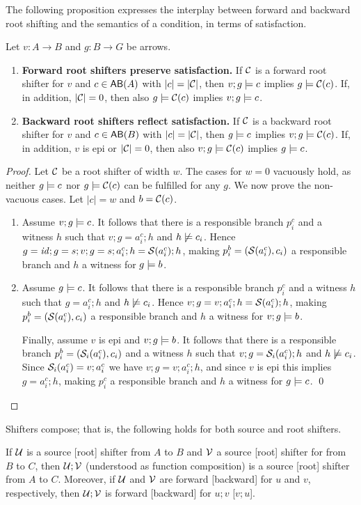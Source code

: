 The following proposition expresses the interplay between forward and backward root shifting and the semantics of a condition, in terms of satisfaction.
%
\begin{proposition}
Let $v:A\to B$ and $g:B\to G$ be arrows.
\begin{enumerate}
\item {\bfseries Forward root shifters preserve satisfaction.} If $\mathcal{C}$ is a forward root shifter for $v$ and $c\in\AB A$ with $|c|=|\mathcal{C}|$, then $v;g\models c$ implies $g\models \mathcal{C}(c)$. If, in addition, $|\mathcal{C}|=0$, then also $g\models \mathcal{C}(c)$ implies $v;g\models c$.
\item {\bfseries Backward root shifters reflect satisfaction.} If $\mathcal{C}$ is a backward root shifter for $v$ and $c\in\AB B$ with $|c|=|\mathcal{C}|$, then $g\models c$ implies $v;g\models \mathcal{C}(c)$. If, in addition, $v$ is epi or $|\mathcal{C}|=0$, then also $v;g\models \mathcal{C}(c)$ implies $g\models c$.
\end{enumerate}
\end{proposition}
%
\begin{proof}
Let $\mathcal{C}$ be a root shifter of width $w$. The cases for $w=0$ vacuously hold, as neither $g\models c$ nor $g\models \mathcal{C}(c)$ can be fulfilled for any $g$. We now prove the non-vacuous cases. Let $|c|=w$ and $b=\mathcal{C}(c)$.
\begin{enumerate}
\item Assume $v;g\models c$. It follows that there is a responsible branch $p^c_i$ and a witness $h$ such that $v;g=a^c_i;h$ and $h\not\models c_i$. Hence $g=\mathit{id};g=s;v;g=s;a^c_i;h=\mathcal{S}(a^c_i);h$, making $p^b_i=(\mathcal{S}(a^c_i),c_i)$ a responsible branch and $h$ a witness for $g\models b$.

\item Assume $g\models c$. It follows that there is a responsible branch $p^c_i$ and a witness $h$ such that $g=a^c_i;h$ and $h\not\models c_i$. Hence $v;g=v;a^c_i;h=\mathcal{S}(a^c_i);h$, making $p^b_i=(\mathcal{S}(a^c_i),c_i)$ a responsible branch and $h$ a witness for $v;g\models b$.

\smallskip
Finally, assume $v$ is epi and $v;g\models b$. It follows that there is a responsible branch $p^b_i=(\mathcal{S}_i(a^c_i),c_i)$ and a witness $h$ such that $v;g=\mathcal{S}_i(a^c_i);h$ and $h\not\models c_i$. Since $\mathcal{S}_i(a^c_i)=v;a^c_i$ we have $v;g=v;a^c_i;h$, and since $v$ is epi this implies $g=a^c_i;h$, making $p^c_i$ a responsible branch and $h$ a witness for $g\models c$.
\qed
\end{enumerate}
\end{proof}
%
Shifters compose; that is, the following holds for both source and root shifters.
%
\begin{proposition}
If $\mathcal{U}$ is a source [root] shifter from $A$ to $B$ and $\mathcal{V}$ a source [root] shifter for from $B$ to $C$, then $\mathcal{U};\mathcal{V}$ (understood as function composition) is a source [root] shifter from $A$ to $C$. Moreover, if $\mathcal{U}$ and $\mathcal{V}$ are forward [backward] for $u$ and $v$, respectively, then $\mathcal{U};\mathcal{V}$ is forward [backward] for $u;v$ [$v;u$].
\end{proposition}

